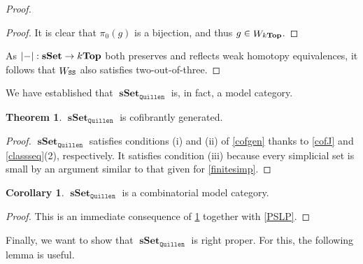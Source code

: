 \documentclass[10pt,letterpaper,cm]{nupset}
\theoremstyle{definition}
\theoremstyle{theorem}
\newtheorem{theorem}[definition]{Theorem}
\newtheorem{corollary}[definition]{Corollary}
\theoremstyle{remark}
\newcommand{\0}{\mathbf{0}}
\newcommand{\1}{\mathbf{1}}
\newcommand{\2}{\mathbf{2}}
\DeclareMathOperator{\sset}{\mathbf{sSet}}
\DeclareMathOperator{\we}{\mathnormal{W}}
\begin{document}
\begin{proof}
\begin{proof}
\medskip

It is clear that $\pi_0(g)$ is a bijection, and thus $g \in \we_{k\mathbf{Top}}$.
\end{proof}
As $\mleft\lvert{-}\mright\rvert : \sset \to k\mathbf{Top}$ both preserves and reflects weak homotopy equivalences, it follows that $\we_{\mathtt{SS}}$ also satisfies two-out-of-three.
\end{proof}

\smallskip

We have established that $\sset_{\mathtt{Quillen}}$ is, in fact, a model category. 

\medskip

\begin{theorem}\label{CFG}
$\sset_{\mathtt{Quillen}}$ is cofibrantly generated.
\end{theorem}
\begin{proof}
$\sset_{\mathtt{Quillen}}$ satisfies conditions (i) and (ii) of \cref{cofgen} thanks to \cref{cofJ} and \cref{classseq}(2), respectively. It satisfies condition (iii) because every simplicial set is small by an argument similar to that given for \cref{finitesimp}.
\end{proof}

\begin{corollary}
$\sset_{\mathtt{Quillen}}$  is a combinatorial model category.
\end{corollary}
\begin{proof}
This is an immediate consequence of \cref{CFG} together with \cref{PSLP}.
\end{proof}

\medskip

Finally, we want to show that $\sset_{\mathtt{Quillen}}$ is right proper. For this, the following lemma is useful.
\end{document}
